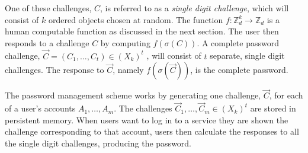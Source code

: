 \par One of these challenges, $C$, is referred to as a \emph{single digit challenge}, which will consist of $k$ ordered objects chosen at random. The function $f: \mathbb{Z}^k_d \rightarrow \mathbb{Z}_d$ is a human computable function as discussed in the next section. The user then responds to a challenge $C$ by computing $f(\sigma(C))$. A complete password challenge, $\vec C = (C_1,\dots,C_t) \in (X_k)^t$ , will consist of $t$ separate, single digit challenges. The response to $\vec C$, namely $f(\sigma(\vec C))$, is the complete password. 
\par The password management scheme works by generating one challenge, $\vec C$, for each of a user's accounts $A_1,\dots,A_m$. The challenges $\vec C_1,\dots,\vec C_m \in (X_k)^t$ are stored in persistent memory. When users want to log in to a service they are shown the challenge corresponding to that account, users then calculate the responses to all the single digit challenges, producing the password.

